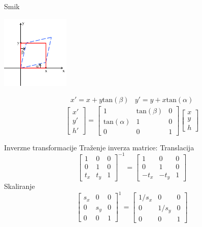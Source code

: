 \documentclass[9pt]{beamer}
\begin{document}
\begin{frame}{Smik}
	\begin{center}
		\includegraphics[height=3.5cm]{slike/2dsmik.png}
	\end{center}
	$$ \begin{array}{cc} x' = x+y\text{tan}(\beta)  & 
	y' = y+x\text{tan}(\alpha) \end{array}$$
	$$ \left[ \begin{array}{c} x' \\ y' \\ h'  \end{array} \right] = 
	\left[ \begin{array}{ccc}
	1 & \text{tan}(\beta) & 0 \\
	\text{tan}(\alpha) & 1 & 0 \\
	0 & 0 & 1 
	\end{array} \right]
	\left[ \begin{array}{c} x \\ y \\ h \end{array} \right] 
	$$
	
\end{frame}

\begin{frame}{Inverzne transformacije}
	Traženje inverza matrice:
	Translacija
	\[ \left[ \begin{array}{ccc}
	1 & 0 & 0 \\
	0 & 1 & 0 \\
	t_{x} & t_{y} & 1 
	\end{array} \right] ^{-1}  =  \left[ \begin{array}{ccc}
	1 & 0 & 0 \\
	0 & 1 & 0 \\
	-t_{x} & -t_{y} & 1 
	\end{array} \right] \]
	Skaliranje
	\[ \left[ \begin{array}{ccc}
	s_{x} & 0 & 0 \\
	0 & s_{y} & 0 \\
	0 & 0 & 1 
	\end{array} \right]^{1} = 
	\left[ \begin{array}{ccc}
	1/s_{x} & 0 & 0 \\
	0 & 1/s_{y} & 0 \\
	0 & 0 & 1 
	\end{array} \right]\]
\end{frame}
\end{document}
